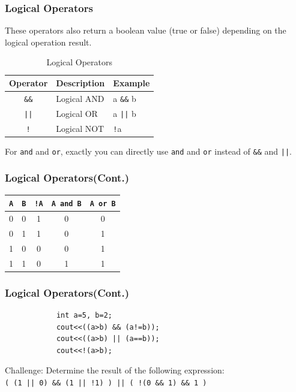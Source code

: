 \documentclass[xcolor=dvipsnames]{beamer}
\begin{document}
    \begin{frame}
        \frametitle{Logical Operators}
        These operators also return a boolean value (true or false) depending on the logical operation result.
        \begin{table}[h]
        \centering
        \caption{Logical Operators}
        \begin{tabular}{cll}
        \toprule
        \textbf{Operator} & \textbf{Description} & \textbf{Example} \\
         \midrule
            \texttt{\&\&} & Logical AND & a \texttt{\&\&} b \\
            \texttt{||}  & Logical OR & a \texttt{||} b \\
            \texttt{!}   & Logical NOT & \texttt{!}a \\
        \bottomrule
        \end{tabular}
        \end{table}
        For \texttt{and} and \texttt{or}, exactly you can directly use \texttt{and} and \texttt{or} instead of \texttt{\&\&} and \texttt{||}.
    \end{frame}

    \begin{frame}
        \frametitle{Logical Operators(Cont.)}
        \begin{table}[h]
            \centering
            \begin{tabular}{|c|c||c|c|c|}
                \hline
                \texttt{A} & \texttt{B} & \texttt{!A} & \texttt{A and B} & \texttt{A or B} \\
                \hline
                0 & 0 & 1 & 0 & 0 \\
                0 & 1 & 1 & 0 & 1 \\
                1 & 0 & 0 & 0 & 1 \\
                1 & 1 & 0 & 1 & 1 \\
                \hline
            \end{tabular}
        \end{table}
    \end{frame}

    \begin{frame}[fragile]
        \frametitle{Logical Operators(Cont.)}
        \begin{verbatim}
            int a=5, b=2;
            cout<<((a>b) && (a!=b));
            cout<<((a>b) || (a==b));
            cout<<!(a>b);
        \end{verbatim}
        Challenge: Determine the result of the following expression:\\
        \texttt{( (1 || 0) \&\& (1 || !1) ) || ( !(0 \&\& 1) \&\& 1 )}
    \end{frame}
\end{document}
